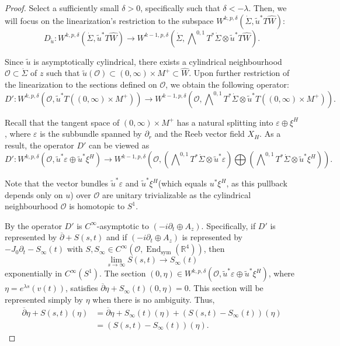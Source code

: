 \documentclass[11pt, a4paper]{amsart}
\newcommand{\cO}{\mathcal{O}}
\DeclareMathOperator{\End}{End}
\begin{document}
\begin{proof}
Select a sufficiently small $\delta > 0$, specifically such that $\delta < -\lambda$. Then, we will focus on the linearization's restriction to the subspace $W^{k,p,\delta}\left(\dot{\Sigma},\tilde{u}^*T\widehat{W}\right)$:
$$D_{\tilde{u}}: W^{k,p,\delta}\left(\dot{\Sigma},\tilde{u}^*T\widehat{W}\right) \rightarrow W^{k-1,p,\delta}\left(\dot{\Sigma}, \bigwedge\nolimits^{0,1} T^*\dot{\Sigma}\otimes \tilde{u}^*T\widehat{W}\right).$$
 
Since $\tilde{u}$ is asymptotically cylindrical, there exists a cylindrical neighbourhood $\cO \subset \dot{\Sigma}$ of $z$ such that $\tilde{u}(\cO) \subset (0,\infty)\times M^+ \subset \widehat{W}$. Upon further restriction of the linearization to the sections defined on $\cO$, we obtain the following operator:
$$D': W^{k,p,\delta}\left(\cO,\tilde{u}^*T\left((0,\infty)\times M^+\right)\right) \rightarrow W^{k-1,p,\delta}\left(\cO, \bigwedge\nolimits^{0,1} T^*\dot{\Sigma}\otimes \tilde{u}^*T\left((0,\infty)\times M^+\right)\right).$$

Recall that the tangent space of $(0,\infty)\times M^+$ has a natural splitting into $\varepsilon \oplus \xi^H$, where $\varepsilon$ is the subbundle spanned by $\partial_r$ and the Reeb vector field $X_{H}$. As a result, the operator $D'$ can be viewed as 
$$D': W^{k,p,\delta}\left(\cO,\tilde{u}^*\varepsilon \oplus \tilde{u}^*\xi^H \right) \rightarrow W^{k-1,p,\delta}\left(\cO, \left(\bigwedge\nolimits^{0,1} T^*\dot{\Sigma}\otimes \tilde{u}^*\varepsilon\right) \bigoplus \left(\bigwedge\nolimits^{0,1} T^*\dot{\Sigma}\otimes \tilde{u}^*\xi^H\right)\right).$$

Note that the vector bundles $\tilde{u}^*\varepsilon$ and $\tilde{u}^*\xi^H$(which equals $u^*\xi^H$, as this pullback depends only on $u$) over $\cO$ are unitary trivializable as the cylindrical neighbourhood $\cO$ is homotopic to $S^1$.


By \cite[Proposition~7.9]{SFTwendl} the operator $D'$ is $C^{\infty}$-asymptotic to $(-i\partial_t \oplus A_z)$.  Specifically, if $D'$ is represented by $\overline{\partial}+S(s,t)$ and if $(-i\partial_t \oplus A_z)$ is represented by $-J_0 \partial_t -S_{\infty}(t)$ with $S,S_{\infty} \in C^{\infty}(\cO,\End_{\mathrm{sym}}(\mathbb{R}^4))$, then
$$\lim\limits_{s\rightarrow \infty}S(s,t) \rightarrow S_{\infty}(t)$$
exponentially in $C^{\infty}(S^1)$. The section $(0,\eta)\in W^{k,p,\delta}\left(\cO,\tilde{u}^*\varepsilon \oplus \tilde{u}^*\xi^H \right)$, where $\eta=e^{\lambda s}(v(t))$, satisfies $\overline{\partial}\eta+S_{\infty}(t)(0,\eta)=0$. This section will be represented simply by $\eta$ when there is no ambiguity. Thus, \begin{equation*}
    \begin{split}
        \overline{\partial}\eta+S(s,t)(\eta) &= \overline{\partial}\eta+S_{\infty}(t)(\eta)+ (S(s,t)-S_{\infty}(t))(\eta)\\
        &= \left(S(s,t)-S_{\infty}(t)\right)(\eta).
    \end{split}
\end{equation*} 


\end{proof}
\end{document}
